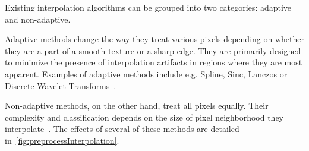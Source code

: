 Existing interpolation algorithms can be grouped into two categories: adaptive and non-adaptive.

Adaptive methods change the way they treat various pixels depending on whether they are a part of a smooth texture or a sharp edge. They are primarily designed to minimize the presence of interpolation artifacts in regions where they are most apparent. Examples of adaptive methods include e.g. Spline, Sinc, Lanczos or Discrete Wavelet Transforms~\cite{interpolation}.

Non-adaptive methods, on the other hand, treat all pixels equally. Their complexity and classification depends on the size of pixel neighborhood they interpolate~\cite{interpolation}. The effects of several of these methods are detailed in~\cref{fig:preprocessInterpolation}.

